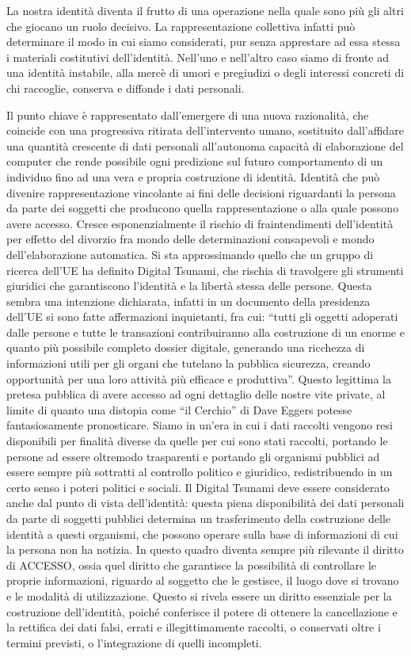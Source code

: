 La nostra identità diventa il frutto di una operazione nella quale sono più gli altri che giocano un ruolo decisivo. La rappresentazione collettiva infatti può determinare il modo in cui siamo considerati, pur senza apprestare ad essa stessa i materiali costitutivi dell’identità.
Nell’uno e nell’altro caso siamo di fronte ad una identità instabile, alla mercè di umori e pregiudizi o degli interessi concreti di chi raccoglie, conserva e diffonde i dati personali.

Il punto chiave è rappresentato dall’emergere di una nuova razionalità, che coincide con una progressiva ritirata dell’intervento umano, sostituito dall’affidare una quantità crescente di dati personali all’autonoma capacità di elaborazione del computer che rende possibile ogni predizione sul futuro comportamento di un individuo fino ad una vera e propria costruzione di identità. Identità che può divenire rappresentazione vincolante ai fini delle decisioni riguardanti la persona da parte dei soggetti che producono quella rappresentazione o alla quale possono avere accesso. Cresce esponenzialmente il rischio di fraintendimenti dell’identità per effetto del divorzio fra mondo delle determinazioni consapevoli e mondo dell’elaborazione automatica. Si sta approssimando quello che un gruppo di ricerca dell’UE ha definito Digital Tsunami, che rischia di travolgere gli strumenti giuridici che garantiscono l’identità e la libertà stessa delle persone. Questa sembra una intenzione dichiarata, infatti in un documento della presidenza dell’UE si sono fatte affermazioni inquietanti, fra cui: “tutti gli oggetti adoperati dalle persone e tutte le transazioni contribuiranno alla costruzione di un enorme e quanto più possibile completo dossier digitale, generando una ricchezza di informazioni utili per gli organi che tutelano la pubblica sicurezza, creando opportunità per una loro attività più efficace e produttiva”.
Questo legittima la pretesa pubblica di avere accesso ad ogni dettaglio delle nostre vite private, al limite di quanto una distopia come “il Cerchio” di Dave Eggers potesse fantasiosamente pronosticare.
Siamo in un’era in cui i dati raccolti vengono resi disponibili per finalità diverse da quelle per cui sono stati raccolti, portando le persone ad essere oltremodo trasparenti e portando gli organismi pubblici ad essere sempre più sottratti al controllo politico e giuridico, redistribuendo in un certo senso i poteri politici e sociali.
Il Digital Tsunami deve essere considerato anche dal punto di vista dell’identità: questa piena disponibilità dei dati personali da parte di soggetti pubblici determina un trasferimento della costruzione delle identità a questi organismi, che possono operare sulla base di informazioni di cui la persona non ha notizia. In questo quadro diventa sempre più rilevante il diritto di ACCESSO, ossia quel diritto che garantisce la possibilità di controllare le proprie informazioni, riguardo al soggetto che le gestisce, il luogo dove si trovano e le modalità di utilizzazione. Questo si rivela essere un diritto essenziale per la costruzione dell’identità, poiché conferisce il potere di ottenere la cancellazione e la rettifica dei dati falsi, errati e illegittimamente raccolti, o conservati oltre i termini previsti, o l’integrazione di quelli incompleti.

